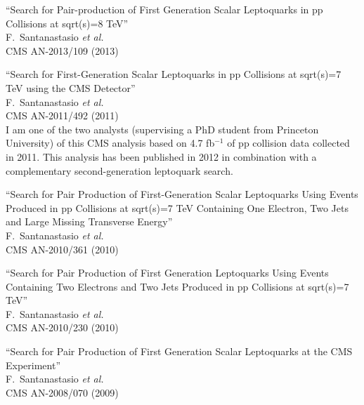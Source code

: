 \documentclass[10pt, a4paper]{article}
\begin{document}
\begin{thebibliography}{599}

``Search for Pair-production of First Generation Scalar Leptoquarks in pp Collisions at sqrt(s)=8 TeV''
  \\{}F.~Santanastasio {\it et al.}
  \\{}CMS AN-2013/109 (2013)

``Search for First-Generation Scalar Leptoquarks in pp Collisions at sqrt(s)=7 TeV using the CMS Detector''
  \\{}F.~Santanastasio {\it et al.}
  \\{}CMS AN-2011/492 (2011)
  \\ I am one of the two analysts (supervising a PhD student from Princeton University) of this CMS analysis based on 4.7 fb$^{-1}$ of pp collision data collected in 2011. 
This analysis has been published in 2012 in combination with a complementary second-generation leptoquark search.

``Search for Pair Production of First-Generation Scalar Leptoquarks Using Events Produced in pp Collisions at sqrt(s)=7 TeV Containing One Electron, Two Jets and Large Missing Transverse Energy''
  \\{}F.~Santanastasio {\it et al.}
  \\{}CMS AN-2010/361 (2010)

``Search for Pair Production of First Generation Leptoquarks Using Events Containing Two Electrons and Two Jets Produced in pp Collisions at sqrt(s)=7 TeV''
  \\{}F.~Santanastasio {\it et al.}
  \\{}CMS AN-2010/230 (2010)

``Search for Pair Production of First Generation Scalar Leptoquarks at the CMS Experiment''
  \\{}F.~Santanastasio {\it et al.}
  \\{}CMS AN-2008/070 (2009)


\end{thebibliography}
\end{document}
